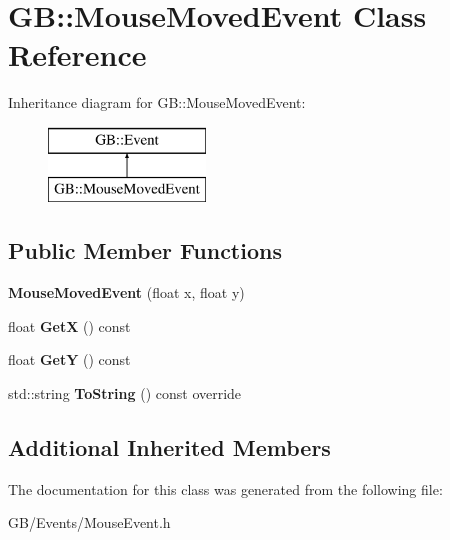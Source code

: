 \hypertarget{class_g_b_1_1_mouse_moved_event}{}\section{GB\+::Mouse\+Moved\+Event Class Reference}
\label{class_g_b_1_1_mouse_moved_event}
Inheritance diagram for GB\+::Mouse\+Moved\+Event\+:\begin{figure}[H]
\begin{center}
\leavevmode
\includegraphics[height=2.000000cm]{class_g_b_1_1_mouse_moved_event}
\end{center}
\end{figure}
\subsection*{Public Member Functions}
\begin{DoxyCompactItemize}
\item 
\mbox{\label{class_g_b_1_1_mouse_moved_event_a97ccc2ab45441de902a0fe8921223beb}} 
{\bfseries Mouse\+Moved\+Event} (float x, float y)
\item 
\mbox{\label{class_g_b_1_1_mouse_moved_event_a90876f53fcb68fbefcb9e0687f78f427}} 
float {\bfseries GetX} () const
\item 
\mbox{\label{class_g_b_1_1_mouse_moved_event_a8b3e5e7c2bc8f61a680bc5638393978b}} 
float {\bfseries GetY} () const
\item 
\mbox{\label{class_g_b_1_1_mouse_moved_event_af6e18e8fd53b2d2e7eafa546160a6256}} 
std\+::string {\bfseries To\+String} () const override
\end{DoxyCompactItemize}
\subsection*{Additional Inherited Members}


The documentation for this class was generated from the following file\+:\begin{DoxyCompactItemize}
\item 
G\+B/\+Events/Mouse\+Event.\+h\end{DoxyCompactItemize}
